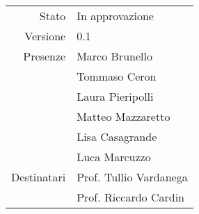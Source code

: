 \begin{center}
\begin{tabular}{r|l}
	Stato & In approvazione \\
	Versione & 0.1 \\
	Presenze & Marco Brunello \\
	         & Tommaso Ceron \\
	         & Laura Pieripolli \\
	         & Matteo Mazzaretto \\
	         & Lisa Casagrande \\
	         & Luca Marcuzzo \\
	Destinatari & Prof. Tullio Vardanega \\
	            & Prof. Riccardo Cardin
\end{tabular}
\end{center}